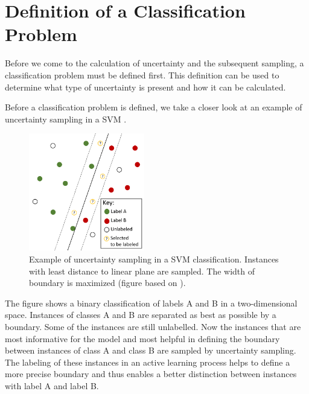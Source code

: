 \section{Definition of a Classification Problem}
\label{sec:definition_of_a_classification_problem}
%
Before we come to the calculation of uncertainty and the subsequent sampling, a classification problem must be defined first.
This definition can be used to determine what type of uncertainty is present and how it can be calculated.

Before a classification problem is defined, we take a closer look at an example of uncertainty sampling in a \ac{SVM} .
\begin{figure}[H]
  \centering
    \includegraphics[width=0.45\textwidth]{figures/SVM.pdf}
  \caption{Example of uncertainty sampling in a \ac{SVM} classification. Instances with least distance to linear plane are sampled.
  The width of boundary is maximized  (figure based on \cite{human-in-the-loop}).}
  \label{fig:svm}
\end{figure}
\clearpage
The figure shows a binary classification of labels A and B in a two-dimensional space.
Instances of classes A and B are separated as best as possible by a boundary.
Some of the instances are still unlabelled.
Now the instances that are most informative for the model and most helpful in defining the boundary between instances of class A and class B are sampled by uncertainty sampling.
The labeling of these instances in an active learning process helps to define a more precise boundary and thus enables a better distinction between instances with label A and label B.

